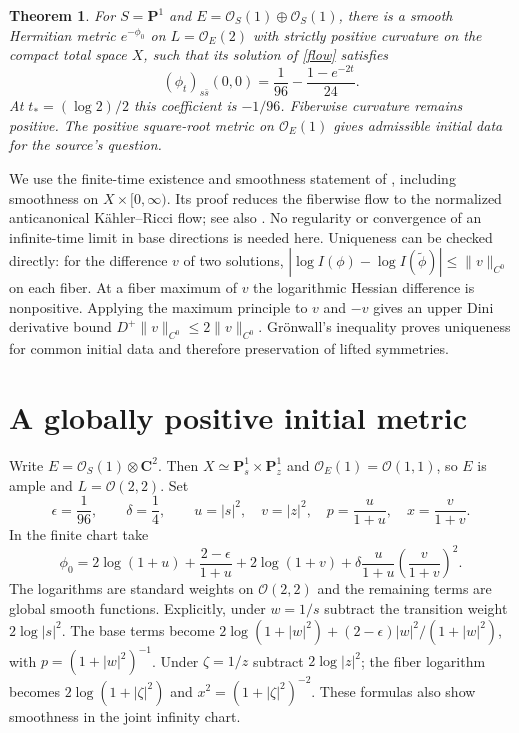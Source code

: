 \documentclass[11pt]{article}
\newtheorem{theorem}{Theorem}
\newcommand{\PP}{\mathbf P}
\newcommand{\OO}{\mathcal O}
\begin{document}
\begin{theorem}\label{thm}
For $S=\PP^1$ and $E=\OO_S(1)\oplus\OO_S(1)$, there is a smooth Hermitian
metric $e^{-\phi_0}$ on $L=\OO_E(2)$ with strictly positive curvature on the
compact total space $X$, such that its solution of \eqref{flow} satisfies
\begin{equation}\label{negative}
 (\phi_t)_{s\bar s}(0,0)=\frac1{96}-\frac{1-e^{-2t}}{24}.
\end{equation}
At $t_*=(\log2)/2$ this coefficient is $-1/96$. Fiberwise curvature remains
positive. The positive square-root metric on $\OO_E(1)$ gives admissible
initial data for the source's question.
\end{theorem}

We use the finite-time existence and smoothness statement of
\cite[Theorem~5]{N}, including smoothness on $X\times[0,\infty)$.
Its proof reduces the fiberwise flow to the normalized anticanonical
K\"ahler--Ricci flow; see also \cite{B}. No regularity or convergence of an
infinite-time limit in base directions is needed here.
Uniqueness can be checked directly: for the difference $v$ of two solutions,
$|\log I(\phi)-\log I(\widetilde\phi)|\leq\|v\|_{C^0}$ on each fiber.
At a fiber maximum of $v$ the logarithmic Hessian difference is nonpositive.
Applying the maximum principle to $v$ and $-v$ gives
an upper Dini derivative bound $D^+\|v\|_{C^0}\leq2\|v\|_{C^0}$.
Gr\"onwall's inequality proves uniqueness for common initial data and
therefore preservation of lifted symmetries.

\section{A globally positive initial metric}
Write $E=\OO_S(1)\otimes\mathbf C^2$. Then
$X\simeq\PP^1_s\times\PP^1_z$ and
$\OO_E(1)=\OO(1,1)$, so $E$ is ample and $L=\OO(2,2)$.
Set
\[
 \epsilon=\frac1{96},\qquad\delta=\frac14,\qquad
 u=|s|^2,\quad v=|z|^2,\quad p=\frac{u}{1+u},\quad x=\frac{v}{1+v}.
\]
In the finite chart take
\begin{equation}\label{initial}
 \phi_0=2\log(1+u)+\frac{2-\epsilon}{1+u}
       +2\log(1+v)+\delta\frac{u}{1+u}\left(\frac{v}{1+v}\right)^2.
\end{equation}
The logarithms are standard weights on $\OO(2,2)$ and the remaining terms
are global smooth functions. Explicitly, under $w=1/s$ subtract the
transition weight $2\log|s|^2$. The base terms become
$2\log(1+|w|^2)+(2-\epsilon)|w|^2/(1+|w|^2)$, with
$p=(1+|w|^2)^{-1}$. Under $\zeta=1/z$ subtract $2\log|z|^2$;
the fiber logarithm becomes $2\log(1+|\zeta|^2)$ and
$x^2=(1+|\zeta|^2)^{-2}$. These formulas also show smoothness in the joint
infinity chart.
\end{document}
